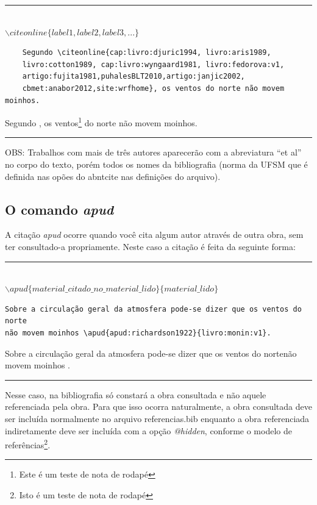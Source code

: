         \begin{center}\rule{0.5\textwidth}{1pt}\\$\backslash citeonline\{label1,label2,label3,...\}$\end{center}
        
	\begin{verbatim}
	Segundo \citeonline{cap:livro:djuric1994, livro:aris1989, 
	livro:cotton1989, cap:livro:wyngaard1981, livro:fedorova:v1, 
	artigo:fujita1981,puhalesBLT2010,artigo:janjic2002,
	cbmet:anabor2012,site:wrfhome}, os ventos do norte não movem moinhos.
	\end{verbatim}
            
        \par Segundo , os ventos\footnote{Este é um teste de nota de rodapé} do norte não movem moinhos.
        \begin{center}\rule{0.5\textwidth}{1pt}\end{center}   
         \par OBS: Trabalhos com mais de três autores aparecerão com a abreviatura ``et al'' no corpo do texto, porém todos os nomes da bibliografia (norma da UFSM que é definida nas opões do abntcite nas definições do arquivo). 
  
  \subsection{O comando \textit{apud}}

  \par A citação \textit{apud} ocorre quando você cita algum autor através de outra obra, sem ter consultado-a propriamente. Neste caso a citação é feita da seguinte forma:
  \begin{center}
  \rule{0.5\textwidth}{1pt}\\
  $\backslash apud\{material\_citado\_no\_material\_lido\}\{material\_lido\}$ \\
  \end{center}
\begin{verbatim}
Sobre a circulação geral da atmosfera pode-se dizer que os ventos do norte
não movem moinhos \apud{apud:richardson1922}{livro:monin:v1}.
\end{verbatim}
  
  Sobre a circulação geral da atmosfera pode-se dizer que os ventos do nortenão movem moinhos .
\begin{center}\rule{0.5\textwidth}{1pt}\end{center}  
  \par Nesse caso, na bibliografia só constará a obra consultada e não aquele referenciada pela obra. Para que isso ocorra naturalmente, a obra consultada deve ser incluída normalmente no arquivo referencias.bib enquanto a obra referenciada indiretamente deve ser incluída com a opção \textit{@hidden}, conforme o modelo de referências\footnote{Isto é um teste de nota de rodapé}.

